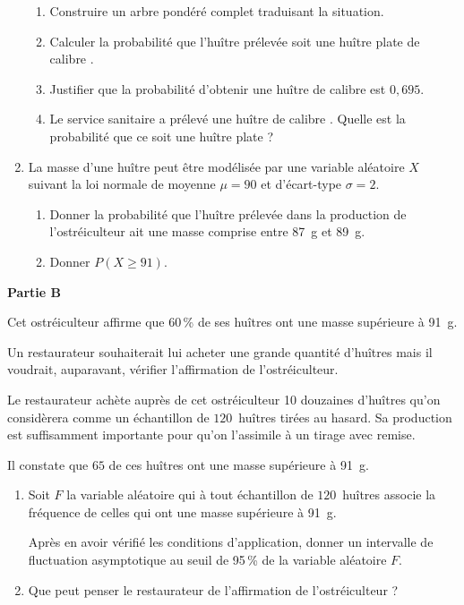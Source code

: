 \documentclass{cornouaille}
\begin{document}
\begin{exercice}
\begin{enumerate}
	\begin{enumerate}
		\item Construire un arbre pondéré complet traduisant la situation. 
		\item Calculer la probabilité que l'huître prélevée soit une huître plate de calibre . 
		\item Justifier que la probabilité d'obtenir une huître de calibre  est $0,695$. 
		\item Le service sanitaire a prélevé une huître de calibre . 
Quelle est la probabilité que ce soit une huître plate ?
	\end{enumerate} 
\item La masse d'une huître peut être modélisée par une variable aléatoire $X$ suivant la loi normale de moyenne $\mu = 90$ et d'écart-type $\sigma = 2$. 
	\begin{enumerate}
		\item Donner la probabilité que l'huître prélevée dans la production de l'ostréiculteur ait une masse comprise entre 87~g et 89~g. 
		\item Donner $P(X \geqslant 91)$.
	\end{enumerate}
\end{enumerate}

\bigskip
	 
\textbf{Partie B}

\medskip
 
Cet ostréiculteur affirme que 60\,\% de ses huîtres ont une masse supérieure à 91~g.
 
Un restaurateur souhaiterait lui acheter une grande quantité d'huîtres mais il voudrait, auparavant, vérifier l'affirmation de l'ostréiculteur.

\medskip
 
Le restaurateur achète auprès de cet ostréiculteur 10 douzaines d'huîtres qu'on considèrera comme un échantillon de $120$~huîtres tirées au hasard. Sa production est suffisamment importante pour qu'on l'assimile à un tirage avec remise.
 
Il constate que $65$ de ces huîtres ont une masse supérieure à 91~g.

\medskip
 
\begin{enumerate}
\item Soit $F$ la variable aléatoire qui à tout échantillon de $120$~huîtres associe la fréquence de celles qui ont une masse supérieure à 91~g. 

Après en avoir vérifié les conditions d'application, donner un intervalle de fluctuation asymptotique au seuil de 95\,\% de la variable aléatoire $F$. 
\item Que peut penser le restaurateur de l'affirmation de l'ostréiculteur ? 
\end{enumerate} 
\end{exercice}
\end{document}
